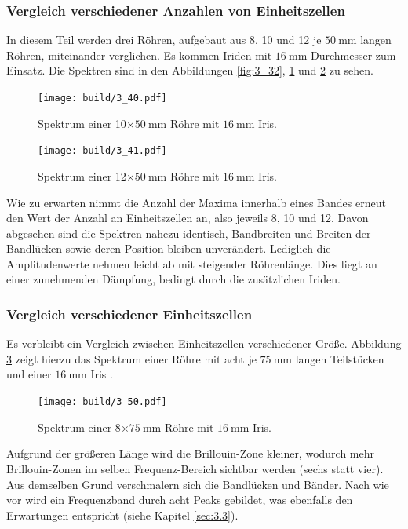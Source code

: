 \subsubsection{Vergleich verschiedener Anzahlen von Einheitszellen}
\label{sec:3.4}
In diesem Teil werden drei Röhren, aufgebaut aus 8, 10 und 12 je $\SI{50}{\milli\meter}$ langen Röhren, miteinander verglichen. Es kommen Iriden mit $\SI{16}{\milli\meter}$ Durchmesser zum Einsatz. Die Spektren sind in den Abbildungen \ref{fig:3_32}, \ref{fig:3_40} und \ref{fig:3_41} zu sehen.
\begin{figure}
  \centering  \texttt{[image: build/3\_40.pdf]}  \caption{Spektrum einer 10$\times\SI{50}{\milli\meter}$ Röhre mit $\SI{16}{\milli\meter}$ Iris.} \label{fig:3_40}
\end{figure}
\begin{figure}
  \centering  \texttt{[image: build/3\_41.pdf]}  \caption{Spektrum einer 12$\times\SI{50}{\milli\meter}$ Röhre mit $\SI{16}{\milli\meter}$ Iris.} \label{fig:3_41}
\end{figure}
Wie zu erwarten nimmt die Anzahl der Maxima innerhalb eines Bandes erneut den Wert der Anzahl an Einheitszellen an, also jeweils 8, 10 und 12. Davon abgesehen sind die Spektren nahezu identisch, Bandbreiten und Breiten der Bandlücken sowie deren Position bleiben unverändert. Lediglich die Amplitudenwerte nehmen leicht ab mit steigender Röhrenlänge. Dies liegt an einer zunehmenden Dämpfung, bedingt durch die zusätzlichen Iriden.

\subsubsection{Vergleich verschiedener Einheitszellen}
Es verbleibt ein Vergleich zwischen Einheitszellen verschiedener Größe. Abbildung \ref{fig:3_50} zeigt hierzu das Spektrum einer Röhre mit acht je $\SI{75}{\milli\meter}$ langen Teilstücken und einer $\SI{16}{\milli\meter}$ Iris .
\begin{figure}
  \centering  \texttt{[image: build/3\_50.pdf]}  \caption{Spektrum einer 8$\times\SI{75}{\milli\meter}$ Röhre mit $\SI{16}{\milli\meter}$ Iris.} \label{fig:3_50}
\end{figure}
Aufgrund der größeren Länge wird die Brillouin-Zone kleiner, wodurch mehr Brillouin-Zonen im selben Frequenz-Bereich sichtbar werden (sechs statt vier). Aus demselben Grund verschmalern sich die Bandlücken und Bänder. Nach wie vor wird ein Frequenzband durch acht Peaks gebildet, was ebenfalls den Erwartungen entspricht (siehe Kapitel \ref{sec:3.3}).

